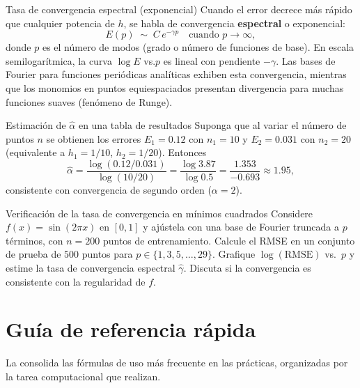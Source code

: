 \begin{definicion}{Tasa de convergencia espectral (exponencial)}
\label{def:tasa_exp}
Cuando el error decrece más rápido que cualquier potencia de $h$,
se habla de convergencia \textbf{espectral} o exponencial:
\[
  E(p) \;\sim\; C\,e^{-\gamma p} \quad \text{cuando } p \to \infty,
\]
donde $p$ es el número de modos (grado o número de funciones de base).
En escala semilogarítmica, la curva $\log E$ vs.\@ $p$ es lineal con
pendiente $-\gamma$. Las bases de Fourier para funciones periódicas
analíticas exhiben esta convergencia, mientras que los monomios en
puntos equiespaciados presentan divergencia para muchas funciones
suaves (fenómeno de Runge).
\end{definicion}

\begin{ejemplo}{Estimación de $\hat{\alpha}$ en una tabla de resultados}
Suponga que al variar el número de puntos $n$ se obtienen los errores
$E_1 = 0.12$ con $n_1 = 10$ y $E_2 = 0.031$ con $n_2 = 20$ (equivalente
a $h_1 = 1/10$, $h_2 = 1/20$). Entonces
\[
  \hat{\alpha} = \frac{\log(0.12/0.031)}{\log(10/20)}
  = \frac{\log 3.87}{\log 0.5}
  = \frac{1.353}{-0.693} \approx 1.95,
\]
consistente con convergencia de segundo orden ($\alpha = 2$).
\end{ejemplo}

\begin{ejerciciocomp}{Verificación de la tasa de convergencia en mínimos cuadrados}
\label{ej:convergencia}
Considere $f(x) = \sin(2\pi x)$ en $[0,1]$ y ajústela con una base de
Fourier truncada a $p$ términos, con $n = 200$ puntos de entrenamiento.
Calcule el RMSE en un conjunto de prueba de $500$ puntos para
$p \in \{1, 3, 5, \ldots, 29\}$. Grafique $\log(\mathrm{RMSE})$ vs.\ $p$
y estime la tasa de convergencia espectral $\hat{\gamma}$. Discuta si la
convergencia es consistente con la regularidad de $f$.
\end{ejerciciocomp}

\section{Guía de referencia rápida}
\label{ap:guia_rapida}

La  consolida las fórmulas de uso más frecuente
en las prácticas, organizadas por la tarea computacional que realizan.

